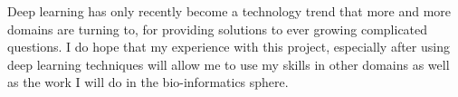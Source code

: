 {Deep learning has only recently become a technology trend that more and more domains are turning to, for providing solutions to ever growing complicated questions. I do hope that my experience with this project, especially after using deep learning techniques will allow me to use my skills in other domains as well as the work I will do in the bio-informatics sphere. }
